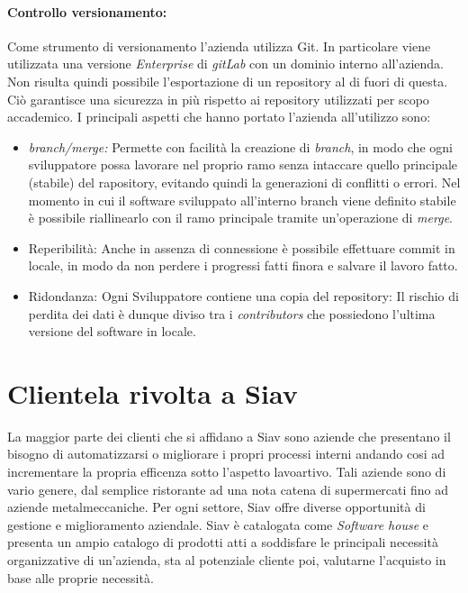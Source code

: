 \paragraph{Controllo versionamento:}
Come strumento di versionamento l'azienda utilizza Git. In particolare viene utilizzata una versione \textit{Enterprise} di \textit{gitLab} con un dominio interno all'azienda. Non risulta quindi possibile l'esportazione di un repository al di fuori di questa. Ciò garantisce una sicurezza in più rispetto ai repository utilizzati per scopo accademico.
I principali aspetti che hanno portato l'azienda all'utilizzo sono:
\begin{itemize}
	\item \textit{branch/merge:} Permette con facilità la creazione di \textit{branch}, in modo che ogni sviluppatore possa lavorare nel proprio ramo senza intaccare quello principale (stabile) del rapository, evitando quindi la generazioni di conflitti o errori. Nel momento in cui il software sviluppato all'interno branch viene definito stabile è possibile riallinearlo con il ramo principale tramite un'operazione di \textit{merge}.
	\item Reperibilità: Anche in assenza di connessione è possibile effettuare commit in locale, in modo da non perdere i progressi fatti finora e salvare il lavoro fatto.
	\item Ridondanza: Ogni Sviluppatore contiene una copia del repository: Il rischio di perdita dei dati è dunque diviso tra i \textit{contributors} che possiedono l'ultima versione del software in locale.
\end{itemize} 
\section{Clientela rivolta a Siav}
La maggior parte dei clienti che si affidano a Siav sono aziende che presentano il bisogno di automatizzarsi o migliorare i propri processi interni andando cosi ad incrementare la propria efficenza sotto l'aspetto lavoartivo. Tali aziende sono di vario genere, dal semplice ristorante ad una nota catena di supermercati fino ad aziende metalmeccaniche. Per ogni settore, Siav offre diverse opportunità di gestione e miglioramento aziendale.
Siav è catalogata come \textit{Software house} e presenta un ampio catalogo di prodotti atti a soddisfare le principali necessità organizzative di un'azienda, sta al potenziale cliente poi, valutarne l'acquisto in base alle proprie necessità. 
